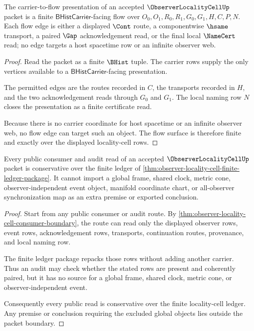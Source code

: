 \begin{theorem}
\label{thm:observer-locality-cell-bhistcarrier-flow-surface}
The carrier-to-flow presentation of an accepted $\ObserverLocalityCellUp$ packet is a finite $\mathsf{BHistCarrier}$-facing flow over $O_0,O_1,R_0,R_1,G_0,G_1,H,C,P,N$. Each flow edge is either a displayed $\Cont$ route, a componentwise $\hsame$ transport, a paired $\Gap$ acknowledgement read, or the final local $\NameCert$ read; no edge targets a host spacetime row or an infinite observer web.
\end{theorem}
\begin{proof}
Read the packet as a finite $\BHist$ tuple. The carrier rows supply the only vertices available to a $\mathsf{BHistCarrier}$-facing presentation.

The permitted edges are the routes recorded in $C$, the transports recorded in $H$, and the two acknowledgement reads through $G_0$ and $G_1$. The local naming row $N$ closes the presentation as a finite certificate read.

Because there is no carrier coordinate for host spacetime or an infinite observer web, no flow edge can target such an object. The flow surface is therefore finite and exactly over the displayed locality-cell rows.
\end{proof}

\begin{theorem}
\label{thm:observer-locality-cell-conservativity-audit-surface}
Every public consumer and audit read of an accepted $\ObserverLocalityCellUp$ packet is conservative over the finite ledger of \autoref{thm:observer-locality-cell-finite-ledger-package}. It cannot import a global frame, shared clock, metric cone, observer-independent event object, manifold coordinate chart, or all-observer synchronization map as an extra premise or exported conclusion.
\end{theorem}
\begin{proof}
Start from any public consumer or audit route. By \autoref{thm:observer-locality-cell-consumer-boundary}, the route can read only the displayed observer rows, event rows, acknowledgement rows, transports, continuation routes, provenance, and local naming row.

The finite ledger package repacks those rows without adding another carrier. Thus an audit may check whether the stated rows are present and coherently paired, but it has no source for a global frame, shared clock, metric cone, or observer-independent event.

Consequently every public read is conservative over the finite locality-cell ledger. Any premise or conclusion requiring the excluded global objects lies outside the packet boundary.
\end{proof}

